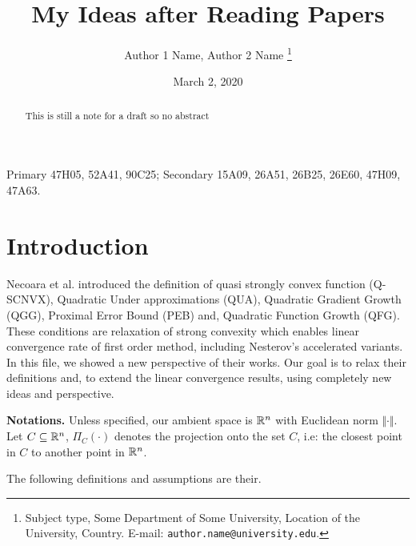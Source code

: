 \documentclass[12pt]{article}
\begin{document}
\newcommand{\dist}{\ensuremath{\operatorname{dist}}}

\title{{\selectfont My Ideas after Reading Papers}}

\author{
    Author 1 Name, Author 2 Name
    \thanks{
        Subject type, Some Department of Some University, Location of the University,
        Country. E-mail: \texttt{author.name@university.edu}.
    }
}

\date{March 2, 2020}

\maketitle
{}

\begin{abstract} 
    \noindent
    This is still a note for a draft so no abstract \cite{bauschke_convex_2017}
\end{abstract}

Primary 47H05, 52A41, 90C25; Secondary 15A09, 26A51, 26B25, 26E60, 47H09, 47A63.


\section{Introduction}
    Necoara et al. introduced the definition of quasi strongly convex function (Q-SCNVX), Quadratic Under approximations (QUA), Quadratic Gradient Growth (QGG), Proximal Error Bound (PEB) and, Quadratic Function Growth (QFG). 
    These conditions are relaxation of strong convexity which enables linear convergence rate of first order method, including Nesterov's accelerated variants. 
    In this file, we showed a new perspective of their works. 
    Our goal is to relax their definitions and, to extend the linear convergence results, using completely new ideas and perspective. 
    \par
    \textbf{Notations.}
    Unless specified, our ambient space is $\mathbb R^n$ with Euclidean norm $\Vert \cdot\Vert$.
    Let $C\subseteq \mathbb R^n$, $\Pi_C(\cdot)$ denotes the projection onto the set $C$, i.e: the closest point in $C$ to another point in $\mathbb R^n$. 
    \par
    The following definitions and assumptions are their. 
    
\end{document}
